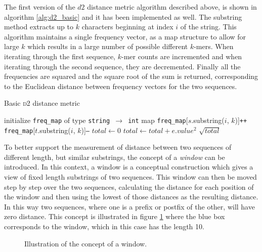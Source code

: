 The first version of the $d2$ distance metric algorithm described above, is
shown in algorithm \ref{alg:d2_basic} and it has been implemented as well. The
substring method extracts up to $k$ characters beginning at index $i$ of the
string. This algorithm maintains a single frequency vector, as a map structure
to allow for large $k$ which results in a large number of possible different
$k$-mers. When iterating through the first sequence, $k$-mer counts are
incremented and when iterating through the second sequence, they are
decremented. Finally all the frequencies are squared and the square root of the
sum is returned, corresponding to the Euclidean distance between frequency
vectors for the two sequences.

\begin{algorithm}
  \caption{Basic \textsc{d2} distance metric}
  \label{alg:d2_basic}
  \begin{algorithmic}[1]
    \Statex
      \State initialize \texttt{freq\_map} of type \texttt{string $\to$ int} map
        \State \texttt{freq\_map}[$s$.substring($i$, $k$)]\texttt{++}
      \EndFor
        \State \texttt{freq\_map}[$t$.substring($i$, $k$)]\texttt{--}
      \EndFor
      \State $total \gets 0$
        \State $total \gets total + e.value^2$
      \EndFor
      \State \Return $\sqrt{total}$
    \EndFunction
  \end{algorithmic}
\end{algorithm}

To better support the measurement of distance between two sequences of
different length, but similar substrings, the concept of a \emph{window} can be
introduced. In this context, a window is a conceptual construction which gives
a view of fixed length substrings of two sequences. This window can then be
moved step by step over the two sequences, calculating the distance for each
position of the window and then using the lowest of those distances as the
resulting distance. In this way two sequences, where one is a prefix or postfix
of the other, will have zero distance. This concept is illustrated in figure
\ref{fig:d2_window_concept} where the blue box corresponds to the window, which
in this case has the length 10.

\begin{figure}[H]
\centering
{}
\caption{Illustration of the concept of a window.}
\label{fig:d2_window_concept}
\end{figure}

